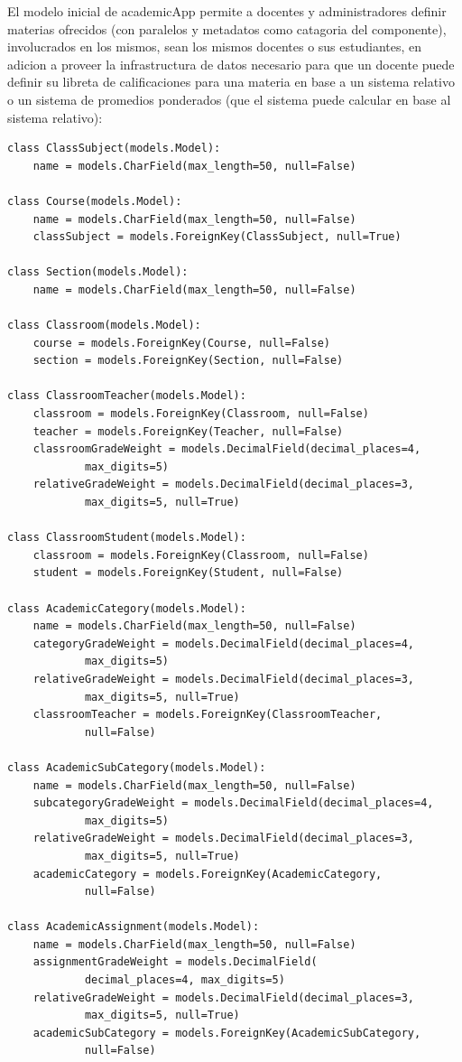 El modelo inicial de academicApp permite a docentes y administradores definir materias ofrecidos (con paralelos y metadatos como catagoria del componente), involucrados en los mismos, sean los mismos docentes o sus estudiantes, en adicion a proveer la infrastructura de datos necesario para que un docente puede definir su libreta de calificaciones para una materia en base a un sistema relativo o un sistema de promedios ponderados (que el sistema puede calcular en base al sistema relativo):
\lstset{language=Python}
\begin{lstlisting}
class ClassSubject(models.Model):
    name = models.CharField(max_length=50, null=False)

class Course(models.Model):
    name = models.CharField(max_length=50, null=False)
    classSubject = models.ForeignKey(ClassSubject, null=True)

class Section(models.Model):
    name = models.CharField(max_length=50, null=False)

class Classroom(models.Model):
    course = models.ForeignKey(Course, null=False)
    section = models.ForeignKey(Section, null=False)

class ClassroomTeacher(models.Model):
    classroom = models.ForeignKey(Classroom, null=False)
    teacher = models.ForeignKey(Teacher, null=False)
    classroomGradeWeight = models.DecimalField(decimal_places=4,
            max_digits=5)
    relativeGradeWeight = models.DecimalField(decimal_places=3,
            max_digits=5, null=True)

class ClassroomStudent(models.Model):
    classroom = models.ForeignKey(Classroom, null=False)
    student = models.ForeignKey(Student, null=False)

class AcademicCategory(models.Model):
    name = models.CharField(max_length=50, null=False)
    categoryGradeWeight = models.DecimalField(decimal_places=4,
            max_digits=5)
    relativeGradeWeight = models.DecimalField(decimal_places=3,
            max_digits=5, null=True)
    classroomTeacher = models.ForeignKey(ClassroomTeacher,
            null=False)

class AcademicSubCategory(models.Model):
    name = models.CharField(max_length=50, null=False)
    subcategoryGradeWeight = models.DecimalField(decimal_places=4,
            max_digits=5)
    relativeGradeWeight = models.DecimalField(decimal_places=3,
            max_digits=5, null=True)
    academicCategory = models.ForeignKey(AcademicCategory,
            null=False)

class AcademicAssignment(models.Model):
    name = models.CharField(max_length=50, null=False)
    assignmentGradeWeight = models.DecimalField(
            decimal_places=4, max_digits=5)
    relativeGradeWeight = models.DecimalField(decimal_places=3,
            max_digits=5, null=True)
    academicSubCategory = models.ForeignKey(AcademicSubCategory,
            null=False)
\end{lstlisting}
